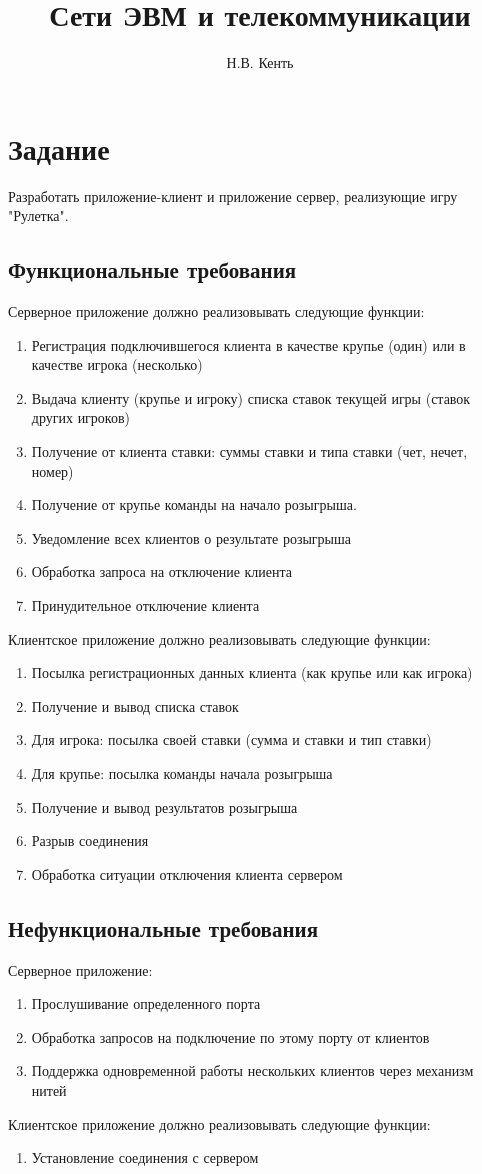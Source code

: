 \documentclass[12pt,a4paper]{report}
\author{Н.В. Кенть}
\title{Сети ЭВМ и телекоммуникации}
\begin{document}
\listoftodos
\maketitle
\chapter{Задание}
Разработать приложение-клиент и приложение сервер, реализующие игру "Рулетка".
\section{Функциональные требования}
Серверное приложение должно реализовывать следующие функции:
\begin{enumerate}
\item{Регистрация подключившегося клиента в качестве крупье (один) или в качестве игрока (несколько) }
\item{Выдача клиенту (крупье и игроку) списка ставок текущей игры (ставок других игроков) }
\item{Получение от клиента ставки: суммы ставки и типа ставки (чет, нечет, номер) }
\item{Получение от крупье команды на начало розыгрыша. }
\item{Уведомление всех клиентов о результате розыгрыша }
\item{Обработка запроса на отключение клиента }
\item{Принудительное отключение клиента }
\end{enumerate}

Клиентское приложение должно реализовывать следующие функции:
\begin{enumerate}
\item{Посылка регистрационных данных клиента (как крупье или как игрока) }
\item{Получение и вывод списка ставок}
\item{Для игрока: посылка своей ставки (сумма и ставки и тип ставки) }
\item{Для крупье: посылка команды начала розыгрыша }
\item{Получение и вывод результатов розыгрыша }
\item{Разрыв соединения}
\item{Обработка ситуации отключения клиента сервером}
\end{enumerate}

\section{Нефункциональные требования}
Серверное приложение:
\begin{enumerate}
\item{Прослушивание определенного порта}
\item{Обработка запросов на подключение по этому порту от клиентов}
\item{Поддержка одновременной работы нескольких клиентов через механизм нитей}
\end{enumerate}
Клиентское приложение должно реализовывать следующие функции:
\begin{enumerate}
\item{Установление соединения с сервером}
\end{enumerate}
\end{document}
